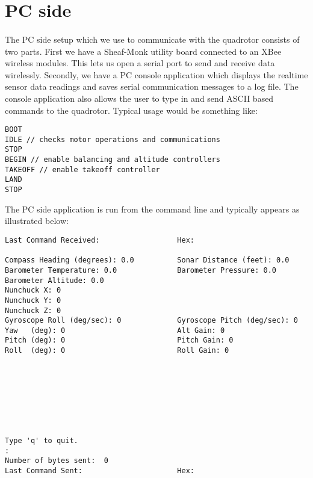 \section{PC side}
\paragraph{}
The PC side setup which we use to communicate with the quadrotor consists of two parts. First we have a Sheaf-Monk utility board connected to an XBee wireless modules.  This lets us open a serial port to send and receive data wirelessly.  Secondly, we have a PC console application which displays the realtime sensor data readings and saves serial communication messages to a log file.  The console application also allows the user to type in and send ASCII based commands to the quadrotor.  Typical usage would be something like:\\
\newline
\begin{lstlisting}[frame=single]
BOOT
IDLE // checks motor operations and communications
STOP
BEGIN // enable balancing and altitude controllers
TAKEOFF // enable takeoff controller
LAND
STOP 
\end{lstlisting}

\clearpage
The PC side application is run from the command line and typically appears as illustrated below:\\
\begin{lstlisting}[frame=single]
Last Command Received:                  Hex:

Compass Heading (degrees): 0.0          Sonar Distance (feet): 0.0
Barometer Temperature: 0.0              Barometer Pressure: 0.0
Barometer Altitude: 0.0
Nunchuck X: 0
Nunchuck Y: 0
Nunchuck Z: 0
Gyroscope Roll (deg/sec): 0             Gyroscope Pitch (deg/sec): 0
Yaw   (deg): 0                          Alt Gain: 0
Pitch (deg): 0                          Pitch Gain: 0
Roll  (deg): 0                          Roll Gain: 0








Type 'q' to quit.
:
Number of bytes sent:  0
Last Command Sent:                      Hex:
\end{lstlisting}
